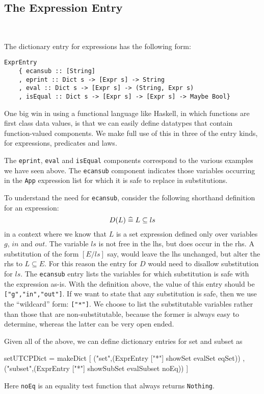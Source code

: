 \subsection{The Expression Entry}~

The dictionary entry for expressions has the following form:
\begin{verbatim}
ExprEntry
    { ecansub :: [String]
    , eprint :: Dict s -> [Expr s] -> String
    , eval :: Dict s -> [Expr s] -> (String, Expr s)
    , isEqual :: Dict s -> [Expr s] -> [Expr s] -> Maybe Bool}
\end{verbatim}
One big win in using a functional language like Haskell,
in which functions are first class data values,
is that we can easily define datatypes that
contain function-valued components.
We make full use of this in three of the entry kinds,
for expressions, predicates and laws.

The \texttt{eprint}, \texttt{eval} and \texttt{isEqual} components correspond
to the various examples we have seen above.
The \texttt{ecansub} component
indicates those variables occurring in the \texttt{App} expression
list for which it is safe to replace in substitutions.

To understand the need for \texttt{ecansub},
consider the following shorthand definition for an expression:
\[
  D(L) \mathrel{\widehat=} L \subseteq ls
\]
in a context where we know that $L$ is a set expression defined
only over variables $g$, $in$ and $out$.
The variable $ls$ is not free in the lhs,
but does occur in the rhs.
A substitution of the form $[E/ls]$ say,
would leave the lhs unchanged, but alter the rhs to $L \subseteq E$.
For this reason the entry for $D$ would need to disallow substitution
for $ls$.
The \texttt{ecansub} entry lists the variables for which substitution
is safe with the expression as-is.
With the definition above, the value of this entry
 should be \texttt{["g","in","out"]}.
If we want to state that any substitution is safe,
then we use the ``wildcard'' form: \texttt{["*"]}.
We choose to list the substitutable variables
rather than those that are non-substitutable,
because the former is always easy to determine,
whereas the latter can be very open ended.

Given all of the above,
we can define dictionary entries for set and subset as
\begin{code}
setUTCPDict = makeDict
 [ ("set",(ExprEntry ["*"] showSet evalSet eqSet))
 , ("subset",(ExprEntry ["*"] showSubSet evalSubset noEq)) ]
\end{code}
Here \texttt{noEq} is an equality test function that always returns \texttt{Nothing}.
